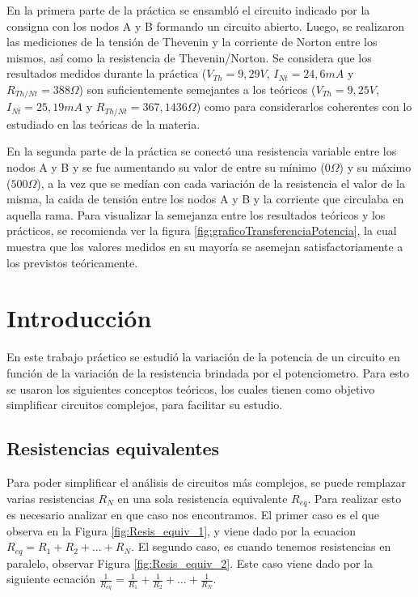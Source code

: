 \documentclass{article}
\begin{document}
        En la primera parte de la práctica se ensambló el circuito indicado por la consigna con los nodos A y B formando un circuito abierto. Luego, se
        realizaron las mediciones de la tensión de Thevenin y la corriente de Norton entre los mismos, así como la resistencia de Thevenin/Norton. 
        Se considera que los resultados medidos durante la práctica ($V_{Th} = 9,29V$, $I_{Nt} = 24,6 mA$ y $R_{Th/Nt} = 388 \Omega$) son suficientemente 
        semejantes a los teóricos ($V_{Th} = 9,25 V$, $I_{Nt} = 25,19 mA$ y $R_{Th/Nt} = 367,1436 \Omega$) como para considerarlos coherentes con lo 
        estudiado en las teóricas de la materia.  \par

        En la segunda parte de la práctica se conectó una resistencia variable entre los nodos A y B y se fue aumentando su valor de entre su mínimo 
        ($0 \Omega$) y su máximo ($500 \Omega$), a la vez que se medían con cada variación de la resistencia el valor de la misma, la caida de
        tensión entre los nodos A y B y la corriente que circulaba en aquella rama. Para visualizar la semejanza entre los resultados teóricos y los 
        prácticos, se recomienda ver la figura \ref{fig:graficoTransferenciaPotencia}, la cual muestra que los valores medidos en su mayoría se asemejan
        satisfactoriamente a los previstos teóricamente. \par



    \newpage

    \tableofcontents %
    \newpage

    \section{Introducción}

        En este trabajo práctico se estudió la variación de la potencia de un circuito en función de la variación de la resistencia brindada por el potenciometro. 
        Para esto se usaron los siguientes conceptos teóricos, los cuales tienen como objetivo simplificar circuitos complejos, para facilitar su estudio.

        \subsection{Resistencias equivalentes}

        Para poder simplificar el análisis de circuitos más complejos, se puede remplazar varias resistencias $R_{N}$ en una sola
         resistencia equivalente $R_{eq}$. Para realizar esto es necesario analizar en que caso nos encontramos. El primer caso es el que observa en la Figura \ref{fig:Resis_equiv_1},
        y viene dado por la ecuacion $R_{eq}=R_{1}+R_{2}+...+R_{N}$. El segundo caso, es cuando tenemos resistencias en paralelo, observar Figura \ref{fig:Resis_equiv_2}. Este caso viene dado por la siguiente ecuación
        $\frac{1}{R_{eq}}= \frac{1}{R_{1}} + \frac{1}{R_{2}} +...+ \frac{1}{R_{N}}$.\par
\end{document}
